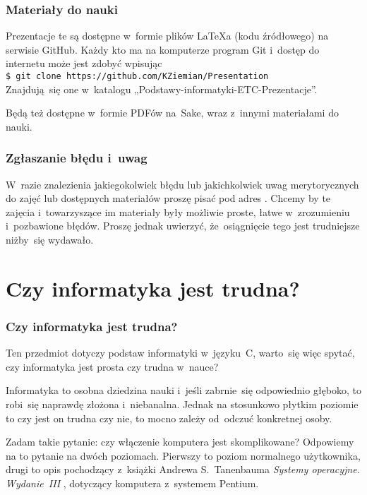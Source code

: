 \documentclass[10pt,t]{beamer}
\begin{document}
\begin{frame}
  \frametitle{Materiały do nauki}


  Prezentacje te są dostępne w~formie plików \LaTeX a (kodu źródłowego)
  na serwisie GitHub. Każdy kto ma na komputerze program Git i~dostęp
  do internetu może jest zdobyć wpisując \\
  \texttt{\$ git clone https://github.com/KZiemian/Presentation} \\
  Znajdują~się one w~katalogu „Podstawy-informatyki-ETC-Prezentacje”.

  Będą też dostępne w~formie PDFów na~Sake, wraz z~innymi materiałami
  do nauki.

\end{frame}





\begin{frame}
  \frametitle{Zgłaszanie błędu i~uwag}


  W~razie znalezienia jakiegokolwiek błędu lub jakichkolwiek uwag
  merytorycznych do zajęć lub dostępnych materiałów proszę pisać pod adres
  \email. Chcemy by te zajęcia i~towarzyszące im materiały były możliwie
  proste, łatwe w~zrozumieniu i~pozbawione błędów. Proszę jednak uwierzyć,
  że~osiągnięcie tego jest trudniejsze niżby~się wydawało.

\end{frame}










\section{Czy informatyka jest trudna?}



\begin{frame}
  \frametitle{Czy informatyka jest trudna?}


  Ten przedmiot dotyczy podstaw informatyki w~języku~C, warto~się
  więc spytać, czy informatyka jest prosta czy trudna w~nauce?

  Informatyka to osobna dziedzina nauki i~jeśli zabrnie~się odpowiednio
  głęboko, to robi~się naprawdę złożona i~niebanalna. Jednak na stosunkowo
  płytkim poziomie to czy jest on trudna czy nie, to mocno zależy od~odczuć
  konkretnej osoby.

  Zadam takie pytanie: czy włączenie komputera jest skomplikowane?
  Odpowiemy na to pytanie na dwóch poziomach. Pierwszy to poziom normalnego
  użytkownika, drugi to opis pochodzący z~książki Andrewa S.~Tanenbauma
  \textit{Systemy operacyjne. Wydanie~III}
  \parencite{Tannenbaum-Systemy-Operacyjne-Wydanie-III-Pub-2013}, dotyczący
  komputera z~systemem Pentium.

\end{frame}
\end{document}
